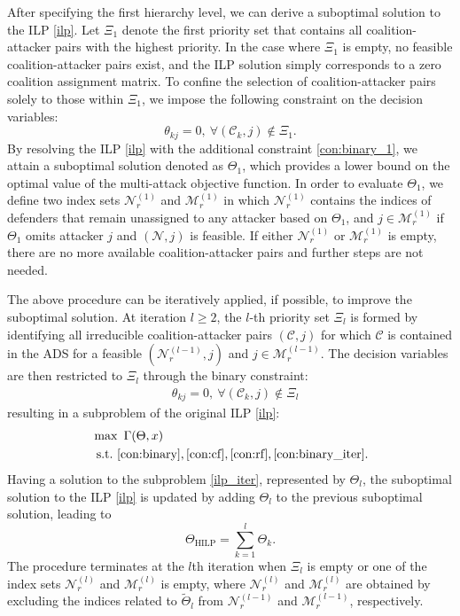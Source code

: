 \documentclass[journal]{IEEEtran}
\newcommand{\N}{\mathcal{N}}
\newcommand{\M}{\mathcal{M}}
\newcommand{\C}{\mathcal{C}}
\newcommand{\1}{\mathbf{1}}
\begin{document}
After specifying the first hierarchy level, we can derive a suboptimal solution to the ILP \eqref{ilp}. Let $\Xi_1$ denote the first priority set that contains all coalition-attacker pairs with the highest priority. In the case where $\Xi_1$ is empty, no feasible coalition-attacker pairs exist, and the ILP solution simply corresponds to a zero coalition assignment matrix. To confine the selection of coalition-attacker pairs solely to those within $\Xi_1$, we impose the following constraint on the decision variables:
\begin{equation}\label{con:binary_1}
	\theta_{kj}=0,~\forall (\C_k,j)\notin \Xi_1.
\end{equation}
By resolving the ILP \eqref{ilp} with the additional constraint \eqref{con:binary_1}, we attain a suboptimal solution denoted as $\Theta_1$, which provides a lower bound on the optimal value of the multi-attack objective function. In order to evaluate $\Theta_1$, we define two index sets $\N_r^{(1)}$ and $\M_r^{(1)}$ in which $\N_r^{(1)}$ contains the indices of defenders that remain unassigned to any attacker based on $\Theta_1$, and $j\in \M_r^{(1)}$ if $\Theta_1$ omits attacker $j$ and $(\N,j)$ is feasible. If either $\N_r^{(1)}$ or $\M_r^{(1)}$ is empty, there are no more available coalition-attacker pairs and further steps are not needed.

The above procedure can be iteratively applied, if possible, to improve the suboptimal solution. At iteration $l\geq 2$, the $l$-th priority set $\Xi_l$ is formed by identifying all irreducible coalition-attacker pairs $(\C,j)$ for which $\C$ is contained in the ADS for a feasible $(\N^{(l-1)}_r,j)$ and $j\in \M_r^{(l-1)}$. The decision variables are then restricted to $\Xi_l$ through the binary constraint:
\begin{equation}\label{con:binary_iter}
	\begin{split}
	    &\theta_{kj}=0,~\forall (\C_k,j)\notin \Xi_l
    \end{split}
\end{equation}
resulting in a subproblem of the original ILP \eqref{ilp}:
\begin{equation}\label{ilp_iter}
    \begin{split}
	    &\max~\Gamma(\Theta,x)\\
	    &~\mathrm{s.t.}~\eqref{con:binary},\eqref{con:cf},\eqref{con:rf},\eqref{con:binary_iter}.
    \end{split}
\end{equation}
Having a solution to the subproblem \eqref{ilp_iter}, represented by $\Theta_l$, the suboptimal solution to the ILP \eqref{ilp} is updated by adding $\Theta_l$ to the previous suboptimal solution, leading to
\begin{equation*}
    \Theta_{\text{HILP}}=\sum_{k=1}^{l}\Theta_k.
\end{equation*}
The procedure terminates at the $l$th iteration when $\Xi_l$ is empty or one of the index sets $\N_r^{(l)}$ and $\M_r^{(l)}$ is empty, where $\N_r^{(l)}$ and $\M_r^{(l)}$ are obtained by excluding the indices related to $\tilde{\Theta}_l$ from $\N_r^{(l-1)}$ and $\M_r^{(l-1)}$, respectively.
\end{document}
